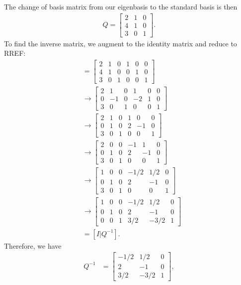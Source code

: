 \documentclass[10pt,a4paper]{article}
\theoremstyle{definition}
\begin{document}
The change of basis matrix from our eigenbasis to the standard basis is then
\begin{align*}
Q = \begin{bmatrix}
2 & 1 & 0\\
4 & 1 & 0\\
3 & 0 & 1
\end{bmatrix}.
\end{align*}
To find the inverse matrix, we augment to the identity matrix and reduce to RREF:
\begin{align*}
[Q | I] &= \begin{bmatrix}
2 & 1 & 0 & 1 & 0 & 0\\
4 & 1 & 0 & 0 & 1 & 0\\
3 & 0 & 1 & 0 & 0 & 1
\end{bmatrix}\\ 
&\to \begin{bmatrix}
2 & 1 & 0 & 1 & 0 & 0\\
0 & -1 & 0 & -2 & 1 & 0\\
3 & 0 & 1 & 0 & 0 & 1
\end{bmatrix} \\
&\to \begin{bmatrix}
2 & 1 & 0 & 1 & 0 & 0\\
0 & 1 & 0 & 2 & -1 & 0\\
3 & 0 & 1 & 0 & 0 & 1
\end{bmatrix} \\
&\to \begin{bmatrix}
2 & 0 & 0 & -1 & 1 & 0\\
0 & 1 & 0 & 2 & -1 & 0\\
3 & 0 & 1 & 0 & 0 & 1
\end{bmatrix} \\
&\to \begin{bmatrix}
1 & 0 & 0 & -1/2 & 1/2 & 0\\
0 & 1 & 0 & 2 & -1 & 0\\
3 & 0 & 1 & 0 & 0 & 1
\end{bmatrix} \\
&\to \begin{bmatrix}
1 & 0 & 0 & -1/2 & 1/2 & 0\\
0 & 1 & 0 & 2 & -1 & 0\\
0 & 0 & 1 & 3/2 & -3/2 & 1
\end{bmatrix} \\
&= [I | Q^{-1}].
\end{align*}
Therefore, we have 
\begin{align*}
Q^{-1} &= \begin{bmatrix}
-1/2 & 1/2 & 0\\
2 & -1 & 0\\
3/2 & -3/2 & 1
\end{bmatrix},
\end{align*}
\end{document}
